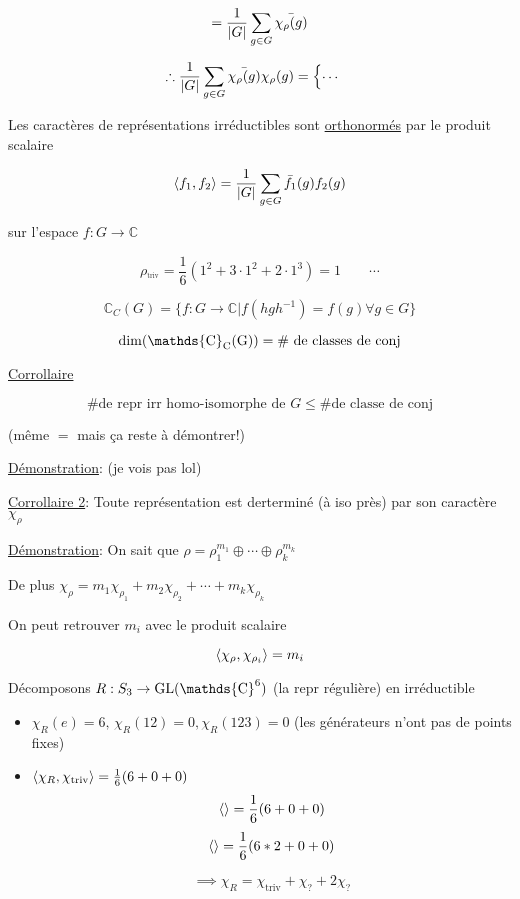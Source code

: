 \[ =  \frac{1}{\abs{G}} \sum_{g \in G} \bar{\chi_{\rho} (g)} \]



\[ \therefore \frac{1}{\abs{G}} \sum_{g \in G} \bar{\chi_{\rho} (g)} \chi_{\rho} (g)  = \begin{cases} \dotsb
	
\end{cases}\]

Les caractères de représentations irréductibles sont \underline{orthonormés} par le produit scalaire 

\[ \expval{f_1 , f_{2}} = \frac{1}{\abs{G}} \sum_{g \in G} \bar{f_1 }(g) f_2 (g)   \]

sur l'espace $f: G \to \mathds{C}$


\begin{tcolorbox}[title=Exemple: $S_3$]
	\[ \rho_{^{\text{triv}}} = \frac{1}{6} \left( 1^2 + 3\cdot 1^2 + 2 \cdot 1^3 \right)  = 1 \qquad \dotsb\] 
\end{tcolorbox}
 
\[ \mathds{C}_C (G) = \{ f: G \to \mathds{C} | f(hgh^{-1}) = f(g) \forall g \in G \}  \]

\[ \rm{dim}(\mathds{C}_C (G)) = \text{\# de classes de conj} \]


\underline{Corrollaire} 

\[ \text{\# de repr irr homo-isomorphe de $G$} \leq \text{\# de classe de conj}   \]

(même $=$ mais ça reste à démontrer!)

\underline{Démonstration}: (je vois pas lol) 

\underline{Corrollaire 2}: Toute représentation est derterminé (à iso près) par son caractère $\chi_{\rho} $ 

\underline{Démonstration}: On sait que $\rho = \rho_1^{m_{1}} \oplus \dotsb \oplus \rho_k^{m_k}$ 

De plus $ \chi_{\rho} = m_1 \chi_{\rho_{1}} + m_2 \chi_{\rho_{2}} + \dotsb + m_k \chi_{\rho_k}  $

On peut retrouver $m_i$ avec le produit scalaire 

\[ \expval{\chi_\rho, \chi_{\rho_i} } = m_i  \]

\begin{tcolorbox}[title=Exemple]
	Décomposons $R:S_3 \to \rm{GL}( \mathds{C}^{6} )$ (la repr régulière) en irréductible 

	\begin{itemize}
		\item $\chi_R (e) =6,\, \chi_R (12) = 0, \chi_R (123) = 0$ (les générateurs n'ont pas de points fixes)
		\item $\expval{\chi_R, \chi_{\text{triv}} } = \frac{1}{6} (6 + 0 + 0)$
			\[ \expval{} = \frac{1}{6} (6 + 0 + 0) \]
			\[ \expval{} = \frac{1}{6} (6*2 + 0 + 0) \]

			\[ \implies \chi_R = \chi_{\text{triv}}  + \chi_? + 2 \chi_? \]
	\end{itemize}

\end{tcolorbox}


